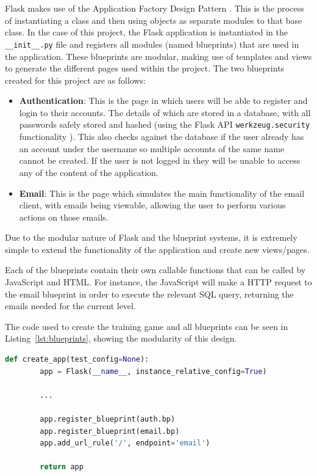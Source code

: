 \documentclass{l4proj}
\begin{document}
Flask makes use of the Application Factory Design Pattern \citep{flask}. This is the process of instantiating a class and then using objects as separate modules to that base class. In the case of this project, the Flask application is instantiated in the \verb| __init__.py| file and registers all modules (named blueprints) that are used in the application. These blueprints are modular, making use of templates and views to generate the different pages used within the project. The two blueprints created for this project are as follows:

\begin{itemize}
  \item \textbf{Authentication}: This is the page in which users will be able to register and login to their accounts. The details of which are stored in a database, with all passwords safely stored and hashed (using the Flask API \verb|werkzeug.security| functionality \citep{werkzeugSecurity}). This also checks against the database if the user already has an account under the username so multiple accounts of the same name cannot be created. If the user is not logged in they will be unable to access any of the content of the application.
  \item \textbf{Email}: This is the page which simulates the main functionality of the email client, with emails being viewable, allowing the user to perform various actions on those emails.
\end{itemize}

Due to the modular nature of Flask and the blueprint systems, it is extremely simple to extend the functionality of the application and create new views/pages.

Each of the blueprints contain their own callable functions that can be called by JavaScript and HTML. For instance, the JavaScript will make a HTTP request to the email blueprint in order to execute the relevant SQL query, returning the emails needed for the current level.

The code used to create the training game and all blueprints can be seen in Listing~\ref{lst:blueprints}, showing the modularity of this design.

\begin{lstlisting}[H, language=python, caption={Creation of training app and all associated blueprints in the \_\_init\_\_.py file}, label=lst:blueprints]
    def create_app(test_config=None):
    	app = Flask(__name__, instance_relative_config=True)
    	
        ...
    
    	app.register_blueprint(auth.bp)
    	app.register_blueprint(email.bp)
    	app.add_url_rule('/', endpoint='email')
    
    	return app
\end{lstlisting}
\end{document}
